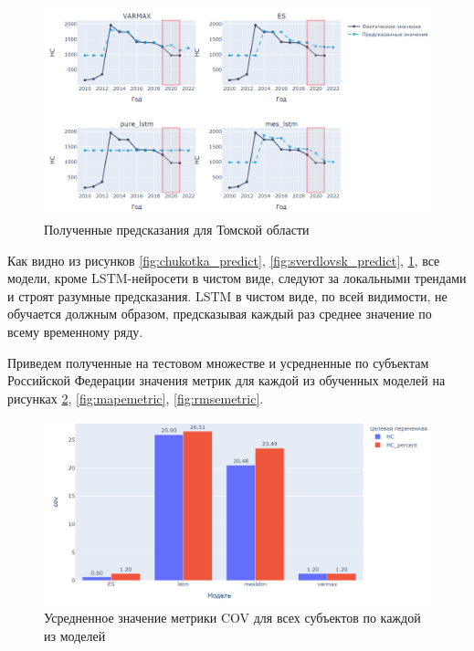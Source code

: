 \begin{figure}[ht]
	\centering
	\includegraphics[width=1\textwidth]{images/tomsk_predict.png}
	\caption{Полученные предсказания для Томской области}
	\label{fig:tomsk_predict}
\end{figure}

Как видно из рисунков \ref{fig:chukotka_predict}, \ref{fig:sverdlovsk_predict}, \ref{fig:tomsk_predict}, все модели, кроме LSTM-нейросети в чистом виде, следуют за локальными трендами и строят разумные предсказания. LSTM в чистом виде, по всей видимости, не обучается должным образом, предсказывая каждый раз среднее значение по всему временному ряду. 

Приведем полученные на тестовом множестве и усредненные по субъектам Российской Федерации значения метрик для каждой из обученных моделей на рисунках \ref{fig:covmetric}, \ref{fig:mapemetric}, \ref{fig:rmsemetric}.

\begin{figure}[th]
	\centering
	\includegraphics[width=1\textwidth]{images/cov_metric}
	\caption{Усредненное значение метрики COV для всех субъектов по каждой из моделей}
	\label{fig:covmetric}
\end{figure}

